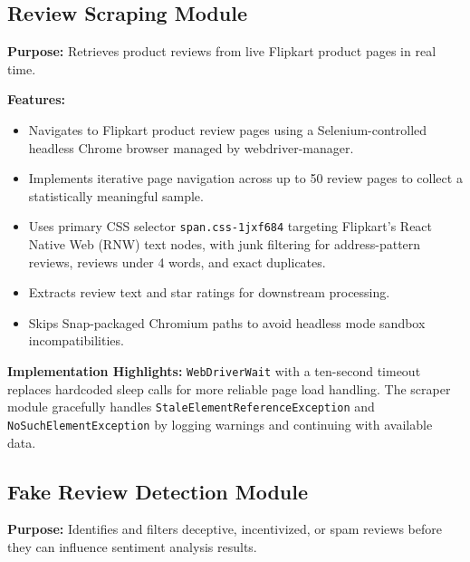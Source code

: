 \documentclass[12pt,a4paper]{report}
\begin{document}
\subsection{Review Scraping Module}

\textbf{Purpose:} Retrieves product reviews from live Flipkart product pages in real time.

\textbf{Features:}
\begin{itemize}
  \item Navigates to Flipkart product review pages using a Selenium-controlled headless Chrome browser managed by webdriver-manager.
  \item Implements iterative page navigation across up to 50 review pages to collect a statistically meaningful sample.
  \item Uses primary CSS selector \texttt{span.css-1jxf684} targeting Flipkart's React Native Web (RNW) text nodes, with junk filtering for address-pattern reviews, reviews under 4 words, and exact duplicates.
  \item Extracts review text and star ratings for downstream processing.
  \item Skips Snap-packaged Chromium paths to avoid headless mode sandbox incompatibilities.
\end{itemize}

\textbf{Implementation Highlights:} \texttt{WebDriverWait} with a ten-second timeout replaces hardcoded sleep calls for more reliable page load handling. The scraper module gracefully handles \texttt{StaleElementReferenceException} and \texttt{NoSuchElementException} by logging warnings and continuing with available data.

\subsection{Fake Review Detection Module}

\textbf{Purpose:} Identifies and filters deceptive, incentivized, or spam reviews before they can influence sentiment analysis results.
\end{document}
